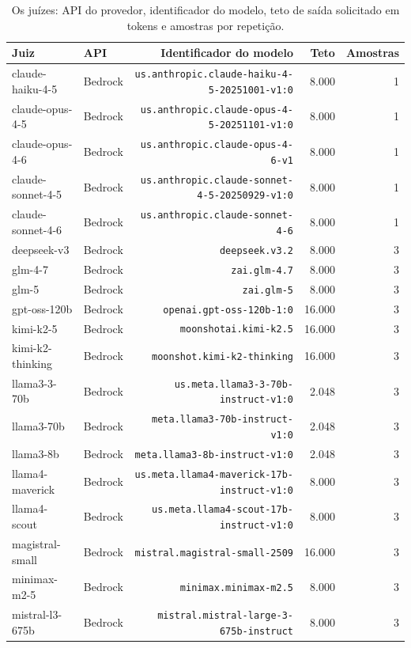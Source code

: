\documentclass{IOS-Book-Article}
\begin{document}
\begin{table}[!ht]
\centering
\caption{Os juízes: API do provedor, identificador do modelo, teto de saída solicitado em tokens e amostras por repetição.}
\footnotesize\setlength{\tabcolsep}{2pt}
\begin{tabular}{llrrr}
\hline
\textbf{Juiz} & \textbf{API} & \textbf{Identificador do modelo} & \textbf{Teto} & \textbf{Amostras} \\
\hline
claude-haiku-4-5 & Bedrock & \texttt{us.anthropic.claude-haiku-4-5-20251001-v1:0} & 8.000 & 1 \\
claude-opus-4-5 & Bedrock & \texttt{us.anthropic.claude-opus-4-5-20251101-v1:0} & 8.000 & 1 \\
claude-opus-4-6 & Bedrock & \texttt{us.anthropic.claude-opus-4-6-v1} & 8.000 & 1 \\
claude-sonnet-4-5 & Bedrock & \texttt{us.anthropic.claude-sonnet-4-5-20250929-v1:0} & 8.000 & 1 \\
claude-sonnet-4-6 & Bedrock & \texttt{us.anthropic.claude-sonnet-4-6} & 8.000 & 1 \\
deepseek-v3 & Bedrock & \texttt{deepseek.v3.2} & 8.000 & 3 \\
glm-4-7 & Bedrock & \texttt{zai.glm-4.7} & 8.000 & 3 \\
glm-5 & Bedrock & \texttt{zai.glm-5} & 8.000 & 3 \\
gpt-oss-120b & Bedrock & \texttt{openai.gpt-oss-120b-1:0} & 16.000 & 3 \\
kimi-k2-5 & Bedrock & \texttt{moonshotai.kimi-k2.5} & 16.000 & 3 \\
kimi-k2-thinking & Bedrock & \texttt{moonshot.kimi-k2-thinking} & 16.000 & 3 \\
llama3-3-70b & Bedrock & \texttt{us.meta.llama3-3-70b-instruct-v1:0} & 2.048 & 3 \\
llama3-70b & Bedrock & \texttt{meta.llama3-70b-instruct-v1:0} & 2.048 & 3 \\
llama3-8b & Bedrock & \texttt{meta.llama3-8b-instruct-v1:0} & 2.048 & 3 \\
llama4-maverick & Bedrock & \texttt{us.meta.llama4-maverick-17b-instruct-v1:0} & 8.000 & 3 \\
llama4-scout & Bedrock & \texttt{us.meta.llama4-scout-17b-instruct-v1:0} & 8.000 & 3 \\
magistral-small & Bedrock & \texttt{mistral.magistral-small-2509} & 16.000 & 3 \\
minimax-m2-5 & Bedrock & \texttt{minimax.minimax-m2.5} & 8.000 & 3 \\
mistral-l3-675b & Bedrock & \texttt{mistral.mistral-large-3-675b-instruct} & 8.000 & 3 \\

\end{tabular}
\end{table}
\end{document}
